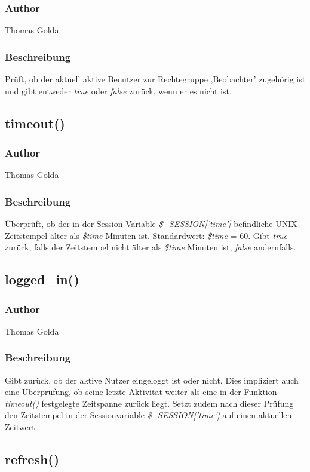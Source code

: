 \documentclass[fontsize = 12pt, paper = a4]{scrreprt}
\begin{document}
\subsubsection*{Author}
Thomas Golda
\subsubsection*{Beschreibung}
Prüft, ob der aktuell aktive Benutzer zur Rechtegruppe ,Beobachter' zugehörig ist und gibt entweder \textit{true} oder \textit{false} zurück, wenn er es nicht ist.


\subsection*{timeout()}
\subsubsection*{Author}
Thomas Golda
\subsubsection*{Beschreibung}
Überprüft, ob der in der Session-Variable \textit{\$\_SESSION['time']} befindliche UNIX-Zeitstempel älter als \textit{\$time} Minuten ist. Standardwert: \textit{\$time} = 60.
Gibt \textit{true} zurück, falls der Zeitstempel nicht älter als \textit{\$time} Minuten ist, \textit{false} andernfalls.


\subsection*{logged\_in()}
\subsubsection*{Author}
Thomas Golda
\subsubsection*{Beschreibung}
Gibt zurück, ob der aktive Nutzer eingeloggt ist oder nicht. Dies impliziert auch eine Überprüfung, ob seine letzte Aktivität weiter als eine in der Funktion \textit{timeout()} festgelegte Zeitspanne zurück liegt.
Setzt zudem nach dieser Prüfung den Zeitstempel in der Sessionvariable \textit{\$\_SESSION['time']} auf einen aktuellen Zeitwert.

\subsection*{refresh()}
\end{document}
